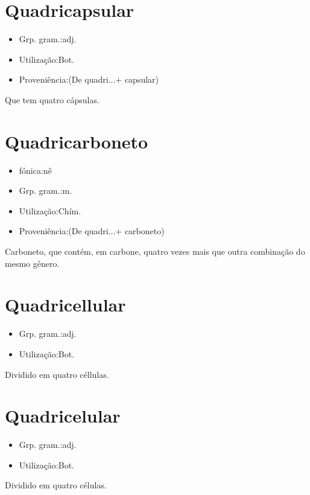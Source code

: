 \section{Quadricapsular}
\begin{itemize}
\item {Grp. gram.:adj.}
\end{itemize}
\begin{itemize}
\item {Utilização:Bot.}
\end{itemize}
\begin{itemize}
\item {Proveniência:(De \textunderscore quadri...\textunderscore  + \textunderscore capsular\textunderscore )}
\end{itemize}
Que tem quatro cápsulas.
\section{Quadricarboneto}
\begin{itemize}
\item {fónica:nê}
\end{itemize}
\begin{itemize}
\item {Grp. gram.:m.}
\end{itemize}
\begin{itemize}
\item {Utilização:Chím.}
\end{itemize}
\begin{itemize}
\item {Proveniência:(De \textunderscore quadri...\textunderscore  + \textunderscore carboneto\textunderscore )}
\end{itemize}
Carboneto, que contém, em carbone, quatro vezes mais que outra combinação do mesmo gênero.
\section{Quadricellular}
\begin{itemize}
\item {Grp. gram.:adj.}
\end{itemize}
\begin{itemize}
\item {Utilização:Bot.}
\end{itemize}
Dividido em quatro céllulas.
\section{Quadricelular}
\begin{itemize}
\item {Grp. gram.:adj.}
\end{itemize}
\begin{itemize}
\item {Utilização:Bot.}
\end{itemize}
Dividido em quatro células.
